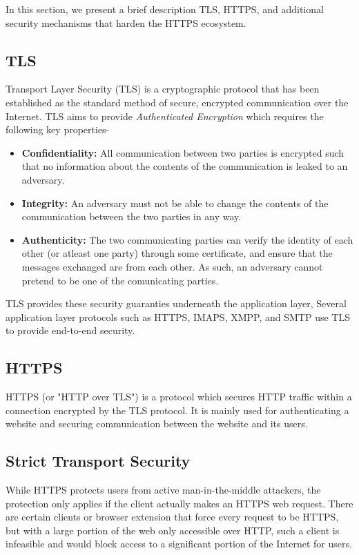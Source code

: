 In this section, we present a brief description TLS, HTTPS, and additional security
mechanisms that harden the HTTPS ecosystem.

\subsection{TLS}
Transport Layer Security (TLS) is a cryptographic protocol that has been
established as the standard method of secure, encrypted communication over the
Internet. TLS aims to provide \emph{Authenticated Encryption} which requires the
following key properties-
\begin{itemize}
  \item \textbf{Confidentiality:} All communication between two parties is
  encrypted such that no information about the contents of the communication is
  leaked to an adversary.

  \item \textbf{Integrity:} An adversary must not be able to change the
  contents of the communication between the two parties in any way.

  \item \textbf{Authenticity:} The two communicating parties can verify the
  identity of each other (or atleast one party) through some certificate, and
  ensure that the messages exchanged are from each other. As such, an adversary
  cannot pretend to be one of the comunicating parties.
\end{itemize}

TLS provides these security guaranties underneath the application layer,
Several application layer protocols such as HTTPS, IMAPS, XMPP, and SMTP use TLS
to provide end-to-end security.

\subsection{HTTPS}
HTTPS (or "HTTP over TLS") is a protocol which secures HTTP traffic within a
connection encrypted by the TLS protocol. It is mainly used for authenticating
a website and securing communication between the website and its users.

\subsection{Strict Transport Security}
While HTTPS protects users from active man-in-the-middle attackers, the
protection only applies if the client actually makes an HTTPS web request.
There are certain clients or browser extension that force every request to be
HTTPS, but with a large portion of the web only accessible over HTTP, such a
client is infeasible and would block access to a significant portion of the
Internet for users.

